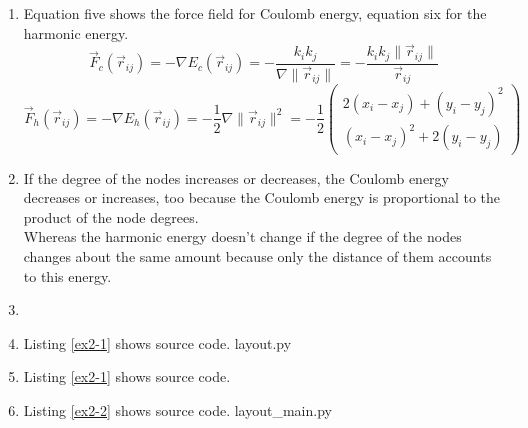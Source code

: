 \documentclass[10pt,a4paper]{article}
\begin{document}
\begin{enumerate}
\item Equation five shows the force field for Coulomb energy, equation six for the harmonic energy.
\begin{equation}
\vec{F}_c(\vec{r}_{ij}) = -\nabla E_c(\vec{r}_{ij})
= -\frac{k_i k_j}{\nabla \|\vec{r}_{ij}\|}
= -\frac{k_i k_j \|\vec{r}_{ij}\|}{\vec{r}_{ij}}
\end{equation}
\begin{equation}
\vec{F}_h(\vec{r}_{ij}) = -\nabla E_h(\vec{r}_{ij})
= -\frac{1}{2} \nabla \|\vec{r}_{ij}\|^2
= -\frac{1}{2} \begin{pmatrix}
2(x_i-x_j) + (y_i-y_j)^2 \\
(x_i-x_j)^2 + 2(y_i-y_j)
\end{pmatrix}
\end{equation}

\item If the degree of the nodes increases or decreases, the Coulomb energy decreases or increases, too because the Coulomb energy is proportional to the product of the node degrees.\\
Whereas the harmonic energy doesn't change if the degree of the nodes changes about the same amount because only the distance of them accounts to this energy.

\item 

\item Listing \ref{ex2-1} shows source code.
 {layout.py}

\item Listing \ref{ex2-1} shows source code.\\


\item Listing \ref{ex2-2} shows source code.
 {layout_main.py}
\end{enumerate}
\end{document}
